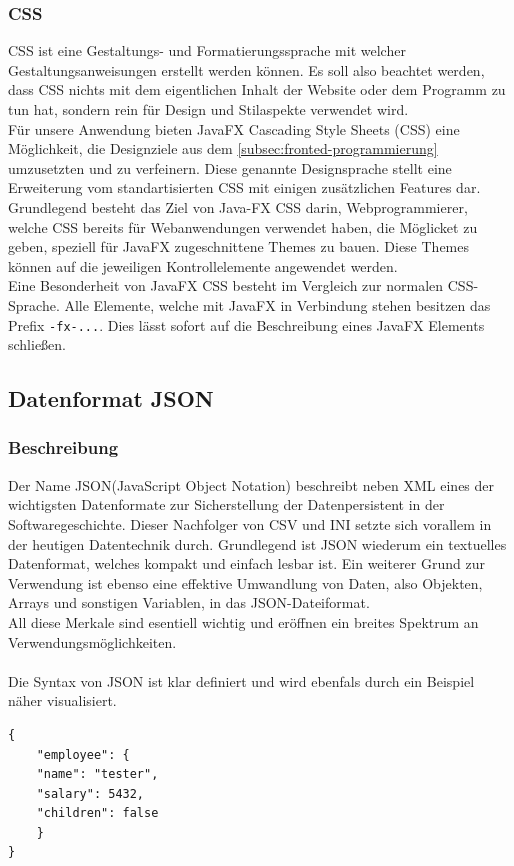 \subsubsection{CSS}\label{sssec:CSS}
CSS ist eine Gestaltungs- und Formatierungssprache mit welcher Gestaltungsanweisungen erstellt werden können.
Es soll also beachtet werden, dass CSS nichts mit dem eigentlichen Inhalt der Website oder dem Programm zu tun hat, sondern rein für Design und Stilaspekte verwendet wird.\\
 Für unsere Anwendung bieten JavaFX Cascading Style Sheets (CSS) eine Möglichkeit, die Designziele aus dem \autoref{subsec:fronted-programmierung} umzusetzten und zu verfeinern.
Diese genannte Designsprache stellt eine Erweiterung vom standartisierten CSS mit einigen zusätzlichen Features dar.\\
Grundlegend besteht das Ziel von Java-FX CSS darin, Webprogrammierer, welche CSS bereits für Webanwendungen verwendet haben, die Möglicket zu geben, speziell für JavaFX zugeschnittene Themes zu bauen.
Diese Themes können auf die jeweiligen Kontrollelemente angewendet werden.\\
Eine Besonderheit von JavaFX CSS besteht im Vergleich zur normalen CSS-Sprache.
Alle Elemente, welche mit JavaFX in Verbindung stehen besitzen das Prefix \lstinline{-fx-...}.
Dies lässt sofort auf die Beschreibung eines JavaFX Elements schließen.
\subsection{Datenformat JSON}\label{subsec:json}

\subsubsection{Beschreibung}
Der Name JSON(JavaScript Object Notation) beschreibt neben XML eines der wichtigsten Datenformate zur Sicherstellung der Datenpersistent in der Softwaregeschichte.
Dieser Nachfolger von CSV und INI setzte sich vorallem in der heutigen Datentechnik durch.
Grundlegend ist JSON wiederum ein textuelles Datenformat, welches kompakt und einfach lesbar ist.
Ein weiterer Grund zur Verwendung ist ebenso eine effektive Umwandlung von Daten, also Objekten, Arrays und sonstigen Variablen,  in das JSON-Dateiformat.\\
All diese Merkale sind esentiell wichtig und eröffnen ein breites Spektrum an Verwendungsmöglichkeiten.\\\\
Die Syntax von JSON ist klar definiert und wird ebenfals durch ein Beispiel näher visualisiert.
\begin{lstlisting}[style=json, caption=JSON-Codebeispiel,label=jsonExample]
{
    "employee": {
    "name": "tester",
    "salary": 5432,
    "children": false
    }
}
\end{lstlisting}

